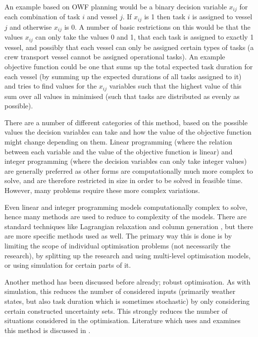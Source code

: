 \documentclass[a4paper,12pt]{article}
\begin{document}
An example based on OWF planning would be a binary decision variable $x_{ij}$ for each combination of task $i$ and vessel $j$. If $x_{ij}$ is 1 then task $i$ is assigned to vessel $j$ and otherwise $x_{ij}$ is 0. A number of basic restrictions on this would be that the values $x_{ij}$ can only take the values 0 and 1, that each task is assigned to exactly 1 vessel, and possibly that each vessel can only be assigned certain types of tasks (a crew transport vessel cannot be assigned operational tasks). An example objective function could be one that sums up the total expected task duration for each vessel (by summing up the expected durations of all tasks assigned to it) and tries to find values for the $x_{ij}$ variables such that the highest value of this sum over all values in minimised (such that tasks are distributed as evenly as possible). 

There are a number of different categories of this method, based on the possible values the decision variables can take and how the value of the objective function might change depending on them. Linear programming (where the relation between each variable and the value of the objective function is linear) and integer programming (where the decision variables can only take integer values) are generally preferred as other forms are computationally much more complex to solve, and are therefore restricted in size in order to be solved in feasible time. However, many problems require these more complex variations.

Even linear and integer programming models computationally complex to solve, hence many methods are used to reduce to complexity of the models. There are standard techniques like Lagrangian relaxation \cite{fisher1981lagrangian} and column generation \cite{barnhart1998branch}, but there are more specific methods used as well. The primary way this is done is by limiting the scope of individual optimisation problems (not necessarily the research), by splitting up the research and using multi-level optimisation models, or using simulation for certain parts of it. 

Another method has been discussed before already; robust optimisation. As with simulation, this reduces the number of considered inputs (primarily weather states, but also task duration which is sometimes stochastic) by only considering certain constructed uncertainty sets. This strongly reduces the number of situations considered in the optimisation. Literature which uses and examines this method is discussed in . 
\end{document}
